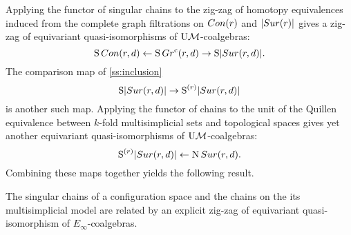 %



Applying the functor of singular chains to the zig-zag of homotopy equivalences induced from the complete graph filtrations on $Con(r)$ and $\lvert Sur(r)\rvert$ gives a zig-zag of equivariant quasi-isomorphisms of $\mathrm{U}\mathcal{M}$-coalgebras:
\[
\operatorname{S}Con(r,d) \leftarrow \operatorname{S} Gr^{\mathrm{c}}(r,d) \to \operatorname{S}\lvert Sur(r,d)\rvert.
\]
The comparison map of \cref{ss:inclusion}
\[
\operatorname{S}\lvert Sur(r,d)\rvert \to \operatorname{S}^{(r)}\lvert Sur(r,d)\rvert
\]
is another such map.
Applying the functor of chains to the unit of the Quillen equivalence between $k$-fold multisimplicial sets and topological spaces gives yet another equivariant quasi-isomorphisms of $\mathrm{U}\mathcal{M}$-coalgebras:
\[
\operatorname{S}^{(r)}\lvert Sur(r,d)\rvert \leftarrow \operatorname{N}Sur(r,d).
\]
Combining these maps together yields the following result.
\begin{theorem*}
	The singular chains of a configuration space and the chains on the its multisimplicial model are related by an explicit zig-zag of equivariant quasi-isomorphism of $E_\infty$-coalgebras.
\end{theorem*}

